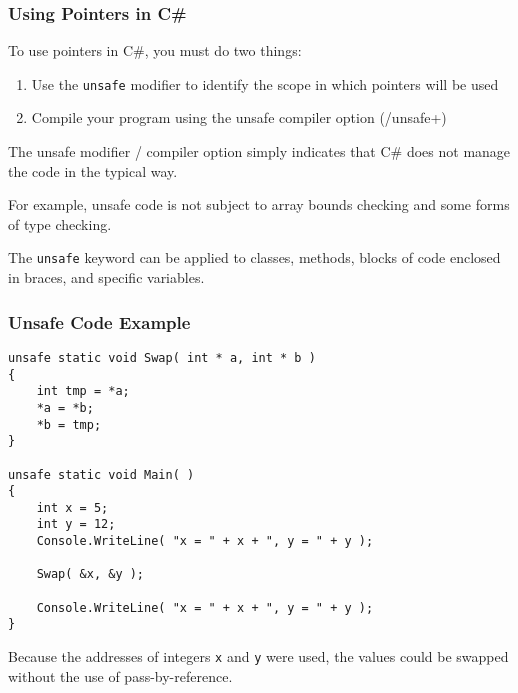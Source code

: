 \begin{frame}
\frametitle{Using Pointers in C\#}

To use pointers in C\#, you must do two things:
\begin{enumerate}
	\item Use the \texttt{unsafe} modifier to identify the scope in which pointers will be used
	\item Compile your program using the unsafe compiler option (/unsafe+)
\end{enumerate}

The unsafe modifier / compiler option simply indicates that C\# does not manage the code in the typical way.

For example, unsafe code is not subject to array bounds checking and some forms of type checking.

The \texttt{unsafe} keyword can be applied to classes, methods, blocks of code enclosed in braces, and specific variables.

\end{frame}

\begin{frame}[fragile]
\frametitle{Unsafe Code Example}

{\scriptsize
\begin{verbatim}
unsafe static void Swap( int * a, int * b )
{
    int tmp = *a;
    *a = *b;
    *b = tmp;
}

unsafe static void Main( )
{
    int x = 5;
    int y = 12;
    Console.WriteLine( "x = " + x + ", y = " + y );
	
    Swap( &x, &y );

    Console.WriteLine( "x = " + x + ", y = " + y );
}
\end{verbatim}
}

Because the addresses of integers \texttt{x} and \texttt{y} were used, the values could be swapped without the use of pass-by-reference.

\end{frame}



